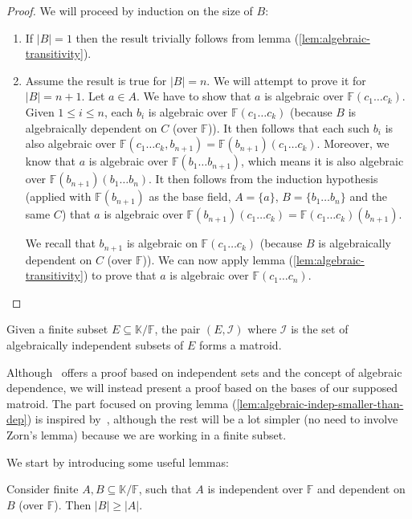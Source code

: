 \begin{proof}
	We will proceed by induction on the size of $B$:
	\begin{enumerate}
		\item If $|B| = 1$ then the result trivially follows from lemma (\ref{lem:algebraic-transitivity}).
		\item Assume the result is true for $|B| = n$. We will attempt to prove it for $|B| = n + 1$. Let $a \in A$. We have to show that $a$ is algebraic over $\mathbb{F}(c _1 \ldots c _k )$. Given $1 \leq i \leq n$, each $b _i$ is algebraic over $\mathbb{F}(c _1 \ldots c _k )$ (because $B$ is algebraically dependent on $C$ (over $\mathbb{F}$)). It then follows that each such $b _i $ is also algebraic over $\mathbb{F}(c _1 \ldots c _k, b _{n + 1}) = \mathbb{F} (b _{n + 1} )(c _1 \ldots c _k )$. Moreover, we know that $a$ is algebraic over $\mathbb{F} (b _1 \ldots b _{n + 1})$, which means it is also algebraic over $\mathbb{F} (b _{n + 1})(b _1 \ldots b _n )$. It then follows from the induction hypothesis (applied with $\mathbb{F} (b _{n + 1})$ as the base field, $A = \{a\}$, $B = \{b _1 \ldots b _n \}$ and the same $C$) that $a$ is algebraic over $\mathbb{F} (b _{n + 1})(c _1 \ldots c _k ) = \mathbb{F} (c _1 \ldots c _k )(b _{n + 1})$.

		      We recall that $b _{n + 1}$ is algebraic on $\mathbb{F} (c _1 \ldots c _k )$ (because $B$ is algebraically dependent on $C$ (over $\mathbb{F} $)). We can now apply lemma (\ref{lem:algebraic-transitivity}) to prove that $a$ is algebraic over $\mathbb{F} (c _1 \ldots c _n)$.
	\end{enumerate}
\end{proof}

\begin{theorem}\label{thm:algebraic-matroids-are-matroids}
	Given a finite subset $E \subseteq \mathbb K / \mathbb F$, the pair $(E, \mathcal I)$  where $\mathcal I$ is the set of algebraically independent subsets of $E$ forms a matroid.
\end{theorem}

Although~\cite{oxley1} offers a proof based on independent sets and the concept of algebraic dependence, we will instead present a proof based on the bases of our supposed matroid. The part focused on proving lemma (\ref{lem:algebraic-indep-smaller-than-dep}) is inspired by~\cite{milne2022}, although the rest will be a lot simpler (no need to involve Zorn's lemma) because we are working in a finite subset.


We start by introducing some useful lemmas:
\begin{lemma}\label{lem:algebraic-indep-smaller-than-dep}
	Consider finite $A, B \subseteq \mathbb K / \mathbb F$, such that $A$ is independent over $\mathbb F$ and dependent on $B$ (over $\mathbb F$). Then $|B| \geq |A|$.
\end{lemma}

